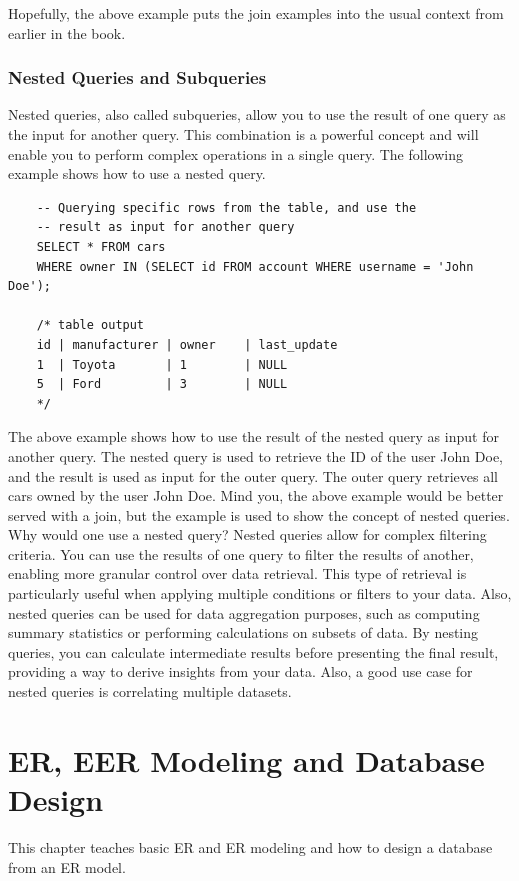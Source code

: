 Hopefully, the above example puts the join examples into the usual context from earlier in the book.


\subsection{Nested Queries and Subqueries}
Nested queries, also called subqueries, allow you to use the result of one query as the input for another query. This combination is a powerful concept and will enable you to perform complex operations in a single query. The following example shows how to use a nested query.

\begin{verbatim}
    -- Querying specific rows from the table, and use the 
    -- result as input for another query
    SELECT * FROM cars
    WHERE owner IN (SELECT id FROM account WHERE username = 'John Doe');

    /* table output
    id | manufacturer | owner    | last_update
    1  | Toyota       | 1        | NULL
    5  | Ford         | 3        | NULL
    */
\end{verbatim}

The above example shows how to use the result of the nested query as input for another query. The nested query is used to retrieve the ID of the user John Doe, and the result is used as input for the outer query. The outer query retrieves all cars owned by the user John Doe. Mind you, the above example would be better served with a join, but the example is used to show the concept of nested queries.
Why would one use a nested query? Nested queries allow for complex filtering criteria. You can use the results of one query to filter the results of another, enabling more granular control over data retrieval. This type of retrieval is particularly useful when applying multiple conditions or filters to your data. Also, nested queries can be used for data aggregation purposes, such as computing summary statistics or performing calculations on subsets of data. By nesting queries, you can calculate intermediate results before presenting the final result, providing a way to derive insights from your data. Also, a good use case for nested queries is correlating multiple datasets.

\chapter{ER, EER Modeling and Database Design}
\label{chap:relational:eer-modeling-and-database-design}
This chapter teaches basic ER and ER modeling and how to design a database from an ER model.

